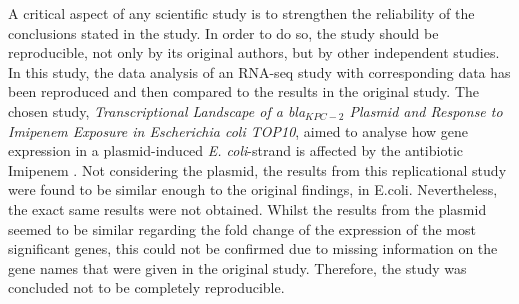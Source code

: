 
A critical aspect of any scientific study is to strengthen the reliability of the conclusions stated in the study. In order to do so, the study should be reproducible, not only by its original authors, but by other independent studies. In this study, the data analysis of an RNA-seq study with corresponding data has been reproduced and then compared to the results in the original study. The chosen study, \textit{Transcriptional Landscape of a bla$_{KPC-2}$ Plasmid and Response to Imipenem Exposure in Escherichia coli TOP10}, aimed to analyse how gene expression in a plasmid-induced \textit{E. coli}-strand is affected by the antibiotic Imipenem \cite{jousset2018transcriptional}. Not considering the plasmid, the results from this replicational study were found to be similar enough to the original findings, in E.coli. Nevertheless, the exact same results were not obtained. Whilst the results from the plasmid seemed to be similar regarding the fold change of the expression of the most significant genes, this could not be confirmed due to missing information on the gene names that were given in the original study. Therefore, the study was concluded not to be completely reproducible.


